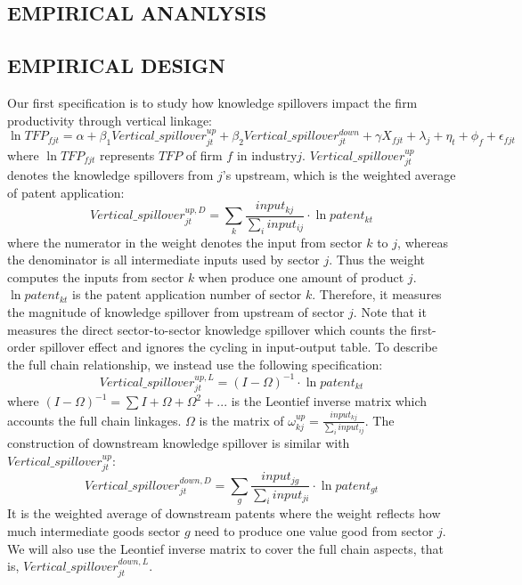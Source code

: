 \documentclass[12pt]{article}%
\begin{document}
\begin{CJK*}{GBK}{fs}
\section{EMPIRICAL ANANLYSIS}
\subsection{EMPIRICAL DESIGN}
Our first specification is to study how knowledge spillovers impact the firm productivity through vertical linkage:
\begin{equation}
  \ln TFP_{fjt}=\alpha+\beta_1 Vertical\_spillover_{jt}^{up}+\beta_2 Vertical\_spillover_{jt}^{down}+\gamma X_{fjt}+\lambda_{j}+\eta_{t}+\phi_{f}+\epsilon_{fjt}
\end{equation}
where $\ln TFP_{fjt}$ represents $TFP$ of firm $f$ in industry$j$. $Vertical\_spillover_{jt}^{up}$ denotes the knowledge spillovers from $j$'s upstream, which is the weighted average of patent application:
\begin{equation*}
  Vertical\_spillover_{jt}^{up,D}=\sum\limits_k\frac{input_{kj}}{\sum_{i}input_{ij}} \cdot \ln patent_{kt}
\end{equation*}
where the numerator in the weight denotes the input from sector $k$ to $j$, whereas the denominator is all intermediate inputs used by sector $j$. Thus the weight computes the inputs from sector $k$ when produce one amount of product $j$. $\ln patent_{kt}$ is the patent application number of sector $k$. Therefore, it measures the magnitude of knowledge spillover from upstream of sector $j$. Note that it measures the direct sector-to-sector knowledge spillover which counts the first-order spillover effect and ignores the cycling in input-output table. To describe the full chain relationship, we instead use the following specification:
\begin{equation*}
  Vertical\_spillover_{jt}^{up,L}=(I-\Omega)^{-1}\cdot \ln patent_{kt}
\end{equation*}
where $(I-\Omega)^{-1}=\sum I+\Omega+\Omega^2+...$ is the Leontief inverse matrix which accounts the full chain linkages. $\Omega$ is the matrix of $\omega_{kj}^{up}=\frac{input_{kj}}{\sum_{i}input_{ij}}$.  The construction of downstream knowledge spillover is similar with $Vertical\_spillover_{jt}^{up}$:
\begin{equation*}
  Vertical\_spillover_{jt}^{down,D}=\sum\limits_g\frac{input_{jg}}{\sum_{i}input_{ji}} \cdot \ln patent_{gt}
\end{equation*}
It is the weighted average of downstream patents where the weight reflects how much intermediate goods sector $g$ need to produce one value good from sector $j$. We will also use the Leontief inverse matrix to cover the full chain aspects, that is,  $Vertical\_spillover_{jt}^{down,L}$. \par

\end{CJK*}
\end{document}
